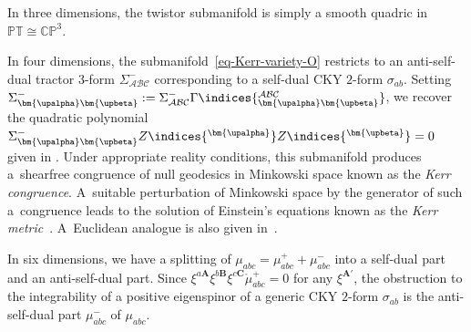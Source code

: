 \documentclass[10pt,a4paper]{amsart}
\numberwithin{equation}{section}
\newcommand{\mbf} [1]{\mathbf{#1}}
\newcommand{\mc} [1]{\mathcal{#1}}
\newcommand{\mr}[1] {\mathring{#1}}
\newcommand{\ind} {\indices}
\newcommand{\PT} {\mathbb{PT}}
\newcommand{\CP} {\mathbb{CP}}
\begin{document}
\begin{Remark}In three dimensions, the twistor submanifold is simply a smooth quadric in $\PT \cong \CP^3$.

In four dimensions, the submanifold~\eqref{eq-Kerr-variety-O} restricts to an anti-self-dual tractor $3$-form $\Sigma^- _{\mc{A} \mc{B} \mc{C}}$ corresponding to a self-dual CKY $2$-form $\sigma_{ab}$. Setting $\Sigma^-_{{\bm{\upalpha}} {\bm{\upbeta}}} := \Sigma^- _{\mc{A} \mc{B} \mc{C}} \Gamma \ind{^{\mc{A} \mc{B} \mc{C}}_{{\bm{\upalpha}} {\bm{\upbeta}}}}$, we recover the quadratic polynomial $\Sigma^-_{{\bm{\upalpha}} {\bm{\upbeta}}} Z \ind{^{\bm{\upalpha}}} Z \ind{^{\bm{\upbeta}}} = 0$ given in \cite{Penrose1986}. Under appropriate reality conditions, this submanifold produces a~shearfree congruence of null geodesics in Minkowski space known as the \emph{Kerr congruence}. A~suitable perturbation of Minkowski space by the generator of such a~congruence leads to the solution of Einstein's equations known as the \emph{Kerr metric}~\cite{Kerr1963,Kerr2009}. A~Euclidean analogue is also given in~\cite{Salamon2009}.

In six dimensions, we have a splitting of $\mu_{abc} = \mu^+_{abc} + \mu^-_{abc}$ into a self-dual part and an anti-self-dual part. Since $\xi^{a\mbf{A}} \xi^{b\mbf{B}} \xi^{c\mbf{C}} \mr{\mu}^+_{abc} = 0$ for any $\xi^{\mbf{A}'}$, the obstruction to the integrability of a positive eigenspinor of a generic CKY $2$-form $\sigma_{ab}$ is the anti-self-dual part $\mu^-_{abc}$ of $\mu_{abc}$.
\end{Remark}
\end{document}

